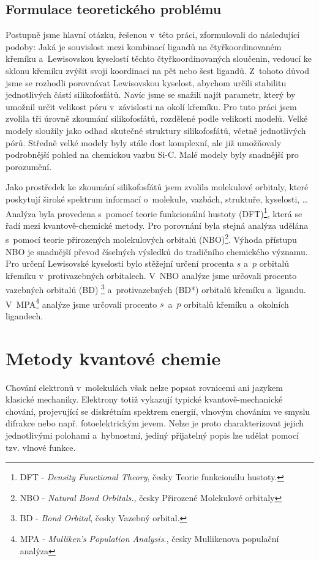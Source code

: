 \documentclass[
digital, %
table,   %
lof,     %
lot,     %
oneside,
]{fithesis3}
\begin{document}
\section{Formulace teoretického problému}
Postupně jsme hlavní otázku, řešenou v~této práci, zformulovali do následující podoby: Jaká je souvislost mezi kombinací ligandů na čtyřkoordinovaném křemíku a~Lewisovskou kyselostí těchto čtyřkoordinovaných sloučenin, vedoucí ke sklonu křemíku zvýšit svoji koordinaci na pět nebo šest ligandů.
Z~tohoto důvod jsme se rozhodli porovnávat Lewisovskou kyselost, abychom určili stabilitu jednotlivých částí silikofosfátů. Navíc jsme se snažili najít parametr, který by umožnil určit velikost póru v~závislosti na okolí křemíku. Pro tuto práci jsem zvolila tři úrovně zkoumání silikofosfátů, rozdělené podle velikosti modelů. Velké modely sloužily jako odhad skutečné struktury silikofosfátů, včetně jednotlivých pórů. Středně velké modely byly stále dost komplexní, ale již umožňovaly podrobnější pohled na chemickou vazbu Si-C. Malé modely byly snadnější pro porozumění.

Jako prostředek ke zkoumání silikofosfátů jsem zvolila molekulové orbitaly, které poskytují široké spektrum informací o~molekule, vazbách, struktuře, kyselosti, \dots  Analýza byla provedena s~pomocí teorie funkcionální hustoty (DFT)\footnote{DFT - \textit{Density Functional Theory}, česky Teorie funkcionálu hustoty.}, která se řadí mezi kvantově-chemické metody. Pro porovnání byla stejná analýza udělána s~pomocí teorie přirozených molekulových orbitalů (NBO)\footnote{NBO - \textit{Natural Bond Orbitals.}, česky Přirozené Molekulové orbitaly}. Výhoda přístupu NBO je snadnější převod číselných výsledků do tradičního chemického významu. Pro určení Lewisovské kyselosti bylo stěžejní určení procenta $s$ a~$p$ orbitalů křemíku v~protivazebných orbitalech.  V~NBO analýze jsme určovali procento vazebných orbitalů (BD) \footnote{BD - \textit{Bond Orbital}, česky Vazebný orbital.} a~protivazebných (BD*) orbitalů křemíku a~ligandu. V~MPA\footnote{MPA - \textit{Mulliken's Population Analysis.}, česky Mullikenova populační analýza} analýze jsme určovali procento $s$~a~$p$ orbitalů křemíku a~okolních ligandech.
\newpage

\chapter{Metody kvantové chemie}
Chování elektronů v~molekulách však nelze popsat rovnicemi ani jazykem klasické mechaniky. Elektrony totiž vykazují typické kvantově-mechanické chování, projevující se diskrétním spektrem energií, vlnovým chováním ve smyslu difrakce nebo např. fotoelektrickým jevem. Nelze je proto charakterizovat jejich jednotlivými polohami a~hybnostmí, jediný přijatelný popis lze udělat pomocí tzv. vlnové funkce.
\end{document}
